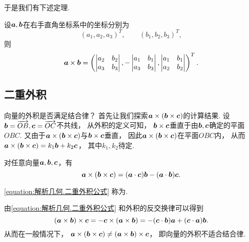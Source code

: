 于是我们有下述定理.
\begin{theorem}
设\(\boldsymbol{a},\boldsymbol{b}\)在右手直角坐标系中的坐标分别为\[
	(a_1,a_2,a_3)^T, \qquad
	(b_1,b_2,b_3)^T,
\]
则
\begin{equation}
	\boldsymbol{a}\times\boldsymbol{b}
	= \left( \begin{vmatrix}
		a_2 & b_2 \\
		a_3 & b_3
	\end{vmatrix},
	- \begin{vmatrix}
		a_1 & b_1 \\
		a_3 & b_3
	\end{vmatrix},
	\begin{vmatrix}
		a_1 & b_1 \\
		a_2 & b_2
	\end{vmatrix} \right)^T.
\end{equation}
\end{theorem}

\subsection{二重外积}
向量的外积是否满足结合律？
首先让我们探索\(\boldsymbol{a}\times(\boldsymbol{b}\times\boldsymbol{c})\)的计算结果.
设\(\boldsymbol{b}=\overrightarrow{OB},\boldsymbol{c}=\overrightarrow{OC}\)不共线，
从外积的定义可知，
\(\boldsymbol{b}\times\boldsymbol{c}\)垂直于由\(\boldsymbol{b},\boldsymbol{c}\)确定的平面\(OBC\).
又由于\(\boldsymbol{a}\times(\boldsymbol{b}\times\boldsymbol{c})\)与\(\boldsymbol{b}\times\boldsymbol{c}\)垂直，
因此\(\boldsymbol{a}\times(\boldsymbol{b}\times\boldsymbol{c})\)在平面\(OBC\)内，
从而\(\boldsymbol{a}\times(\boldsymbol{b}\times\boldsymbol{c}) = k_1 \boldsymbol{b} + k_2 \boldsymbol{c}\)，
其中\(k_1,k_2\)待定.

\begin{theorem}
对任意向量\(\boldsymbol{a},\boldsymbol{b},\boldsymbol{c}\)，有
\begin{equation}\label{equation:解析几何.二重外积公式}
	\boldsymbol{a}\times(\boldsymbol{b}\times\boldsymbol{c})
	= (\boldsymbol{a}\cdot\boldsymbol{c}) \boldsymbol{b}
	- (\boldsymbol{a}\cdot\boldsymbol{b}) \boldsymbol{c}.
\end{equation}
\end{theorem}
\cref{equation:解析几何.二重外积公式}
称为.

由\cref{equation:解析几何.二重外积公式}
和外积的反交换律可以得到\[
	(\boldsymbol{a}\times\boldsymbol{b})\times\boldsymbol{c}
	= -\boldsymbol{c}\times(\boldsymbol{a}\times\boldsymbol{b})
	= -(\boldsymbol{c}\cdot\boldsymbol{b}) \boldsymbol{a}
	+ (\boldsymbol{c}\cdot\boldsymbol{a}) \boldsymbol{b}.
\]
从而在一般情况下，
\(\boldsymbol{a}\times(\boldsymbol{b}\times\boldsymbol{c}) \neq (\boldsymbol{a}\times\boldsymbol{b})\times\boldsymbol{c}\)，
即向量的外积不适合结合律.

